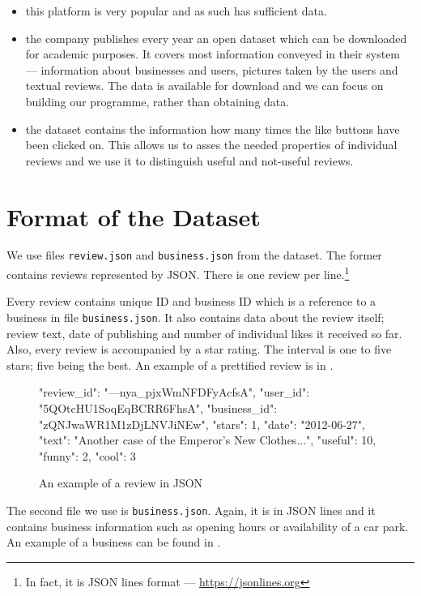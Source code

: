 \begin{itemize}
\item this platform is very popular and as such has sufficient data.

\item the company publishes every year an open dataset which can be downloaded for academic
purposes.
It covers most information conveyed in their system ---  information about businesses and users, pictures taken by the users and textual reviews.
The data is available for download and we can focus on building our programme, rather than obtaining data.

\item  the dataset contains the information how many times the like buttons have been clicked on.
This allows us to asses the needed properties of individual reviews and
we use it to distinguish useful and not-useful reviews.
\end{itemize}

\section{Format of the Dataset}\label{sec:format}

We use files \texttt{review.json} and \texttt{business.json} from the dataset.
The former contains reviews represented by JSON.
There is one review per line.\footnote{In fact, it is JSON lines format --- \url{https://jsonlines.org}}

Every review contains unique ID and business ID which is a reference to a business in file \texttt{business.json}.
It also contains data about the review itself; review text, date of publishing and number of individual likes it received so far.
Also, every review is accompanied by a star rating.
The interval is one to five stars; five being the best.
An example of a prettified review is in .

\begin{figure}[t]\centering
\begin{code}
{
	"review_id": "---nya_pjxWmNFDFyAcfsA",
	"user_id": "5QOtcHU1SoqEqBCRR6FhsA",
	"business_id": "zQNJwaWR1M1zDjLNVJiNEw",
	"stars": 1,
	"date": "2012-06-27",
	"text": "Another case of the Emperor's New Clothes...",
	"useful": 10,
	"funny": 2,
	"cool": 3
}
\end{code}
\caption{An example of a review in JSON}\label{fig:review}
\end{figure}

The second file we use is \texttt{business.json}.
Again, it is in JSON lines and it contains business information such as opening hours or availability of a car park.
An example of a business can be found in .

